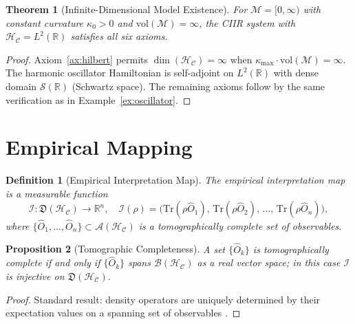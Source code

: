\documentclass[twocolumn,aps,prd,superscriptaddress,nofootinbib]{revtex4-2}
\newtheorem{theorem}{Theorem}[section]
\newtheorem{proposition}[theorem]{Proposition}
\newtheorem{definition}{Definition}[section]
\newcommand{\HC}{\mathcal{H}_{\mathcal{C}}}
\newcommand{\CM}{\mathcal{M}}
\newcommand{\CA}{\mathcal{A}}
\newcommand{\CI}{\mathcal{I}}
\newcommand{\CB}{\mathcal{B}}
\newcommand{\Tr}{\mathrm{Tr}}
\begin{document}
\begin{theorem}[Infinite-Dimensional Model Existence]
\label{thm:infinitedim}
For $\CM = [0,\infty)$ with constant curvature $\kappa_0 > 0$ and
$\mathrm{vol}(\CM) = \infty$, the CIIR system with $\HC = L^2(\mathbb{R})$
satisfies all six axioms.
\end{theorem}

\begin{proof}
Axiom~\ref{ax:hilbert} permits $\dim(\HC) = \infty$ when
$\kappa_\mathrm{max}\cdot\mathrm{vol}(\CM) = \infty$.  The harmonic oscillator
Hamiltonian is self-adjoint on $L^2(\mathbb{R})$ with dense domain
$\mathscr{S}(\mathbb{R})$ (Schwartz space).  The remaining axioms follow by the
same verification as in Example~\ref{ex:oscillator}.
\end{proof}

\section{Empirical Mapping}
\label{sec:empirical}

\begin{definition}[Empirical Interpretation Map]
\label{def:empmap}
The \emph{empirical interpretation map} is a measurable function
\begin{equation}
  \CI : \mathfrak{D}(\HC) \to \mathbb{R}^n,
  \quad
  \CI(\rho) = \bigl(\Tr(\rho\hat{O}_1),\, \Tr(\rho\hat{O}_2),\,\ldots,\,
                    \Tr(\rho\hat{O}_n)\bigr),
  \label{eq:empmap}
\end{equation}
where $\{\hat{O}_1,\ldots,\hat{O}_n\} \subset \CA(\HC)$ is a tomographically
complete set of observables.
\end{definition}

\begin{proposition}[Tomographic Completeness]
\label{prop:tomo}
A set $\{\hat{O}_k\}$ is tomographically complete if and only if
$\{\hat{O}_k\}$ spans $\CB(\HC)$ as a real vector space; in this case $\CI$
is injective on $\mathfrak{D}(\HC)$.
\end{proposition}

\begin{proof}
Standard result: density operators are uniquely determined by their expectation
values on a spanning set of observables \cite{Prugovecki1977}.
\end{proof}
\end{document}
